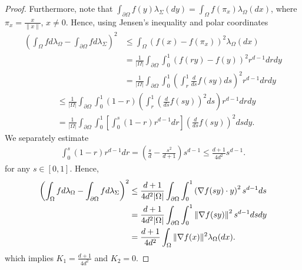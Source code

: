 \documentclass[a4paper]{article}
\theoremstyle{definition}
\numberwithin{equation}{section}
\begin{document}
\begin{proof}
Furthermore, note that $\int_{\partial \Omega} f(y)  \lambda_\Sigma(dy)=\int_\Omega f(\pi_x)  \lambda_\Omega (dx)$, where $\pi_x= \frac{x}{ \|x\| }$, $x \not= 0$. Hence, using  Jensen's inequality and polar coordinates
\begin{align*}
 \left( \int_\Omega f d \lambda_\Omega - \int_{\partial \Omega} f d \lambda_\Sigma \right)^2&\leq  \int_{\Omega} (f(x)-f(\pi_x))^2  \lambda_\Omega (dx)\\
       &=  \frac{ 1 }{ |\Omega| }\int_{ \partial \Omega } \int_{ 0 }^{ 1 }  \left(f(ry)-f(y)\right)^2r^{d-1}drdy \\
    &=  \frac{ 1 }{|\Omega|} \int_{ \partial \Omega }   \int_{ 0 }^{ 1 }  \left( \int_{ r }^{ 1 } \frac{ d }{ ds }f(sy)ds\right)^2r^{d-1}drdy
\end{align*} %
\begin{align*}
  &\leq \frac{ 1 }{ |\Omega| } \int_{ \partial \Omega }    \int_{ 0 }^{ 1 } (1-r)\left( \int_{ r }^{ 1 } \left(\frac{d}{ds}f(sy)\right)^2ds  \right)r^{d-1} drdy\\
    &= \frac{1}{ |\Omega| }\int_{ \partial \Omega }   \int_{ 0 }^{ 1 } \left[ \int_{ 0 }^{ s } (1-r) r^{d-1}dr  \right] \left( \frac{d}{ ds }f(sy) \right)^2 dsdy.
  \end{align*}
  We separately estimate
  \begin{align*}
  \int_{ 0 }^{ s } (1-r) r^{d-1}dr =  \left( \frac{s}{d}-\frac{s^2}{d+1}  \right)s^{d-1}
  \leq \frac{d+1}{4d^2}s^{d-1}.
  \end{align*}
  for any $s \in [0,1]$.
 Hence,
  \begin{align}
  \left( \int_\Omega f d \lambda_\Omega - \int_{\partial \Omega} f d \lambda_\Sigma \right)^2&\leq \frac{ d+1 }{ 4d^2|\Omega| }\int_{ \partial \Omega }    \int_{ 0 }^{ 1 }\left( \nabla f(sy) \cdot y\right)^2s^{d-1} ds \notag\\
  &= \frac{ d+1 }{ 4d^2|\Omega| } \int_{ \partial \Omega }    \int_{ 0 }^{ 1 } \left\| \nabla f(sy)\right\|^2 s^{d-1} dsdy \notag\\
  &= \frac{ d+1 }{ 4d^2 }\int_{ \Omega }   \|\nabla f(x)\|^2 \lambda_\Omega(dx). 
  \label{ineq_interpolation_ball}
  \end{align}
  which implies  $K_1= \frac{d+1}{4d^2}$ and $K_2=0$. 
\end{proof}
\end{document}
